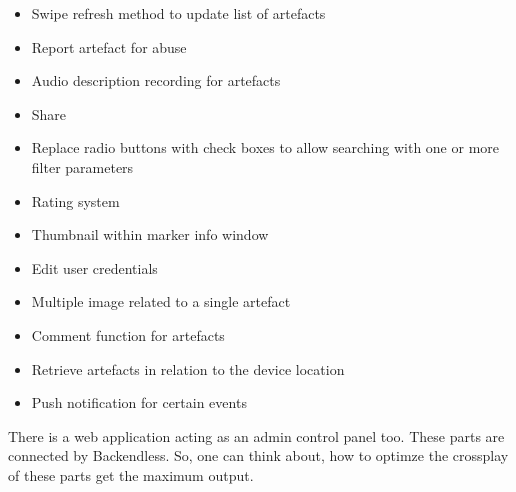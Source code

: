 \begin{itemize}
\item Swipe refresh method to update list of artefacts
\item Report artefact for abuse
\item Audio description recording for artefacts
\item Share
\item Replace radio buttons with check boxes to allow searching with one or more filter parameters
\item Rating system
\item Thumbnail within marker info window
\item Edit user credentials
\item Multiple image related to a single artefact
\item Comment function for artefacts
\item Retrieve artefacts in relation to the device location
\item Push notification for certain events
\end{itemize}

There is a web application acting as an admin control panel too. These parts are connected by Backendless. So, one can think about, how to optimze the crossplay of these parts get the maximum output. 